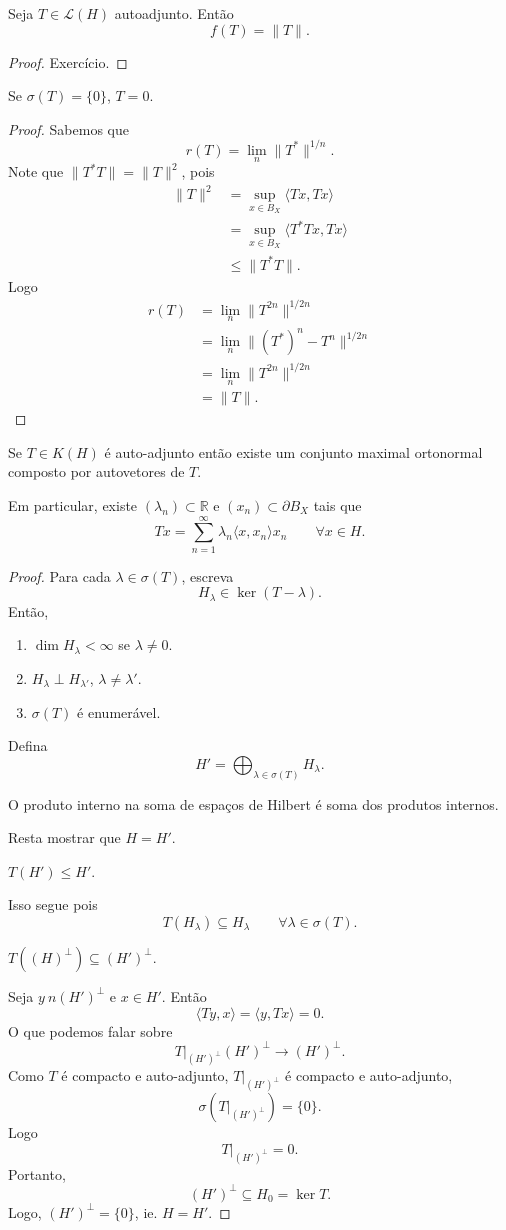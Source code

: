 \documentclass[portuguese]{article}
\theoremstyle{definition}
\newcommand{\R}{\mathbb{R}}
\begin{document}
\begin{prop}
	Seja $T\in\mathcal{L}(H)$ autoadjunto. Então
	\[f(T)=\|T\|.\]
\end{prop}
\begin{proof}
	Exercício.
\end{proof}
\begin{coro}
	Se $\sigma(T)=\{0\}$, $T=0$.
\end{coro}
\begin{proof}
	Sabemos que 
	\[r(T)=\lim_n\|T^*\|^{1/n}.\]
	Note que $\|T^*T\|=\|T\|^2$, pois
	\begin{align*}
		\|T\|^2	&=\sup_{x\in B_X}\langle Tx,Tx\rangle\\
		&=\sup_{x\in B_X}\langle T^*Tx,Tx\rangle\\
		&\leq\|T^*T\|.
	\end{align*}
	Logo
	\begin{align*}
		r(T)&=\lim_n\|T^{2n}\|^{1/2n}\\
		&=\lim_n\|(T^*)^n-T^n\|^{1/2n}\\
		&=\lim_n\|T^{2n}\|^{1/2n}\\
		&=\|T\|.
	\end{align*}
\end{proof}
\begin{teo}
	Se $T\in K(H)$ é auto-adjunto então existe um conjunto maximal ortonormal composto por autovetores de $T$.
	
	Em particular, existe $(\lambda_n)\subset\R$ e $(x_n)\subset\partial B_X$ tais que
	\[Tx=\sum_{n=1}^\infty\lambda_n\langle x,x_n\rangle x_n\qquad \forall x\in H.\]
\end{teo}
\begin{proof}
	Para cada $\lambda\in\sigma(T)$, escreva
	\[H_\lambda\in \ker(T-\lambda).\]
	Então,
	\begin{enumerate}
		\item $\dim H_\lambda<\infty$ se $\lambda\neq0$.
		\item $H_\lambda\perp H_{\lambda'}$, $\lambda\neq\lambda'$.
		\item $\sigma(T)$ é enumerável.
	\end{enumerate}
	Defina
	\[H'=\bigoplus_{\lambda\in\sigma(T)}H_\lambda.\]
	\begin{obs}
		O produto interno na soma de espaços de Hilbert é soma dos produtos internos.
	\end{obs}
	Resta mostrar que $H=H'$.
	\begin{af*}
		$T(H')\leq H'$.
	\end{af*}
	Isso segue pois
	\[T(H_\lambda)\subseteq H_\lambda\qquad\forall\lambda\in\sigma(T).\]
	\begin{af*}
		$T((H)^\perp)\subseteq(H')^\perp$.
	\end{af*}
	Seja $y\ n (H')^\perp$ e $x\in H'$. Então
	\[\langle Ty,x\rangle=\langle y,Tx\rangle=0.\]
	O que podemos falar sobre
	\[T|_{(H')^\perp}(H')^\perp\to(H')^\perp.\]
	Como $T$ é compacto e auto-adjunto, $T|_{(H')^\perp}$ é compacto e auto-adjunto,
	\[\sigma(T|_{(H')^\perp})=\{0\}.\]
	Logo
	\[T|_{(H')^\perp}=0.\]
	Portanto,
	\[(H')^\perp\subseteq H_0=\ker T.\]
	Logo, $(H')^\perp=\{0\}$, ie. $H=H'$.
	
\end{proof}
\end{document}
